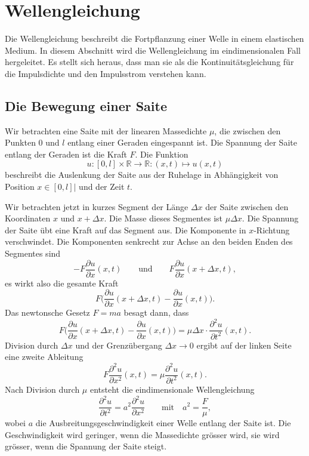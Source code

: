 %
%
\section{Wellengleichung}
Die Wellengleichung beschreibt die Fortpflanzung einer Welle
in einem elastischen Medium.
%
In diesem Abschnitt wird die Wellengleichung im eindimensionalen
Fall hergeleitet.
Es stellt sich heraus, dass man sie als die Kontinuitätsgleichung
für die Impulsdichte und den Impulsstrom verstehen kann.

%
%
\subsection{Die Bewegung einer Saite}
%
Wir betrachten eine Saite mit der linearen Massedichte $\mu$, die
zwischen den Punkten $0$ und $l$ entlang einer Geraden eingespannt
ist.
Die Spannung der Saite entlang der Geraden ist die Kraft $F$.
%
Die Funktion
\[
u
\colon
[0,l]\times \mathbb{R}
\to
\mathbb{R}
:
(x,t)
\mapsto
u(x,t)
\]
beschreibt die Auslenkung der Saite aus der Ruhelage in Abhängigkeit
von Position $x\in[0,l]|$ und der Zeit $t$.
%
%

Wir betrachten jetzt in kurzes Segment der Länge $\Delta x$ der Saite
zwischen den Koordinaten $x$ und $x+\Delta x$.
Die Masse dieses Segmentes ist $\mu \Delta x$.
Die Spannung der Saite übt eine Kraft auf das Segment aus.
Die Komponente in $x$-Richtung verschwindet.
Die Komponenten senkrecht zur Achse an den beiden 
Enden des Segmentes sind
\[
-F\frac{\partial u}{\partial x}(x,t)
\qquad\text{und}\qquad
F\frac{\partial u}{\partial x}(x+\Delta x,t),
\]
es wirkt also die gesamte Kraft
\[
F
\biggl(
\frac{\partial u}{\partial x}(x+\Delta x,t)
-
\frac{\partial u}{\partial x}(x,t)
\biggr).
\]
Das newtonsche Gesetz $F=ma$ besagt dann, dass
%
\[
F
\biggl(
\frac{\partial u}{\partial x}(x+\Delta x,t)
-
\frac{\partial u}{\partial x}(x,t)
\biggr)
=
\mu\Delta x\cdot \frac{\partial^2 u}{\partial t^2}(x,t).
\]
Division durch $\Delta x$ und der Grenzübergang $\Delta x\to 0$ ergibt
auf der linken Seite eine zweite Ableitung
\[
F
\frac{\partial^2u}{\partial x^2}(x,t)
=
\mu
\frac{\partial^2u}{\partial t^2}(x,t).
\]
Nach Division durch $\mu$ entsteht die eindimensionale Wellengleichung
%
\begin{equation}
\frac{\partial^2 u}{\partial t^2}
=
a^2
\frac{\partial^2 u}{\partial x^2}
\qquad\text{mit}\quad
a^2=\displaystyle\frac{F}{\mu},
\label{buch:feldgleichungen:wellengleichung:eqn:wellengleichung}
\end{equation}
wobei $a$ die Ausbreitungsgeschwindigkeit einer Welle entlang der
Saite ist.
Die Geschwindigkeit wird geringer, wenn die Massedichte grösser wird,
sie wird grösser, wenn die Spannung der Saite steigt.


